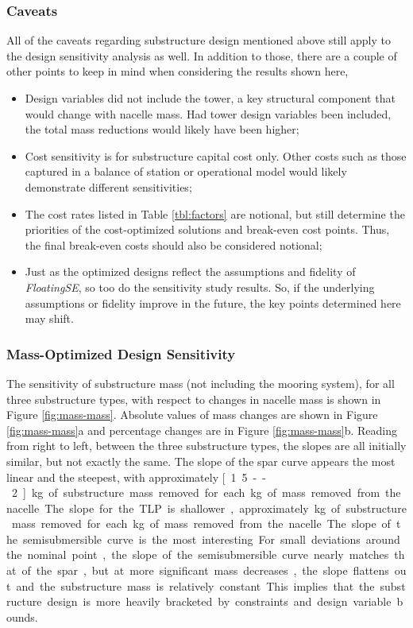\subsubsection{Caveats}
All of the caveats regarding substructure design mentioned above still
apply to the design sensitivity analysis as well.  In addition to those,
there are a couple of other points to keep in mind when considering the
results shown here,
\begin{itemize}
\item Design variables did not include the tower, a key structural
  component that would change with nacelle mass.  Had tower design
  variables been included, the total mass reductions would likely have
  been higher;
\item Cost sensitivity is for substructure capital cost only.  Other
  costs such as those captured in a balance of station or operational
  model would likely demonstrate different sensitivities;
\item The cost rates listed in Table \ref{tbl:factors} are notional,
  but still determine the priorities of the cost-optimized solutions and
  break-even cost points.  Thus, the final break-even costs should also
  be considered notional;
\item Just as the optimized designs reflect the assumptions and
  fidelity of \textit{FloatingSE}, so too do the sensitivity study
  results.  So, if the underlying assumptions or fidelity improve in
  the future, the key points determined here may shift.
\end{itemize}


\subsubsection{Mass-Optimized Design Sensitivity}
The sensitivity of substructure mass (not including the mooring system),
for all three substructure types, with respect to changes in nacelle
mass is shown in Figure \ref{fig:mass-mass}.  Absolute values of mass
changes are shown in Figure \ref{fig:mass-mass}a and percentage changes
are in Figure \ref{fig:mass-mass}b.  Reading from right to left, between
the three substructure types, the slopes are all initially similar, but
not exactly the same.  The slope of the spar curve appears the most
linear and the steepest, with approximately \unit[1.5--2]{kg} of
substructure mass removed for each \unit[1]{kg} of mass removed from the
nacelle.  The slope for the TLP is shallower, approximately
\unit[1]{kg} of substructure mass removed for each \unit[1]{kg} of
mass removed from the nacelle.  The slope of the semisubmersible curve is
the most interesting.  For small deviations around the nominal point,
the slope of the semisubmersible curve nearly matches that of the spar,
but at more significant mass decreases, the slope flattens out and the
substructure mass is relatively constant.  This implies that the
substructure design is more heavily bracketed by constraints and design
variable bounds.

